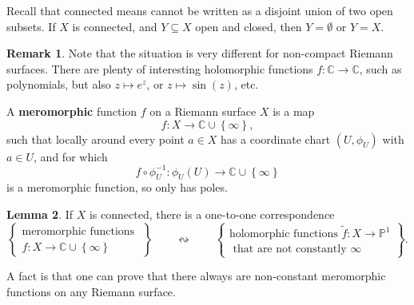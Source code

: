 \documentclass{article}
\newcommand{\C}{\mathbb{C}}
\renewcommand{\P}{\mathbb{P}}
\newcommand{\rb}[1]{\left( #1 \right)}
\newcommand{\cb}[1]{\left\{ #1 \right\}}
\theoremstyle{definition}\newtheorem{definition}{Definition}[section]
\theoremstyle{definition}\newtheorem{notation}[definition]{Notation}
\theoremstyle{definition}\newtheorem{remark}[definition]{Remark}
\theoremstyle{definition}\newtheorem{example1}[definition]{Example}
\theoremstyle{definition}\newtheorem{fact}{Fact}
\theoremstyle{definition}\newtheorem{exercise}{Exercise}
\theoremstyle{definition}\newtheorem*{example2}{Example}
\newtheorem{lemma}[definition]{Lemma}
\begin{document}
Recall that connected means cannot be written as a disjoint union of two open subsets. If $ X $ is connected, and $ Y \subseteq X $ open and closed, then $ Y = \emptyset $ or $ Y = X $.

\begin{remark}
Note that the situation is very different for non-compact Riemann surfaces. There are plenty of interesting holomorphic functions $ f : \C \to \C $, such as polynomials, but also $ z \mapsto e^z $, or $ z \mapsto \sin\rb{z} $, etc.
\end{remark}

A \textbf{meromorphic} function $ f $ on a Riemann surface $ X $ is a map
$$ f : X \to \C \cup \cb{\infty}, $$
such that locally around every point $ a \in X $ has a coordinate chart $ \rb{U, \phi_U} $ with $ a \in U $, and for which
$$ f \circ \phi_U^{-1} : \phi_U\rb{U} \to \C \cup \cb{\infty} $$
is a meromorphic function, so only has poles.

\begin{lemma}
If $ X $ is connected, there is a one-to-one correspondence
$$ \cb{
\begin{array}{c}
\text{meromorphic functions } \\
f : X \to \C \cup \cb{\infty}
\end{array}
} \qquad \leftrightsquigarrow \qquad \cb{
\begin{array}{c}
\text{holomorphic functions } \widetilde{f} : X \to \P^1 \\
\text{ that are not constantly } \infty
\end{array}
}. $$
\end{lemma}

A fact is that one can prove that there always are non-constant meromorphic functions on any Riemann surface.
\end{document}

